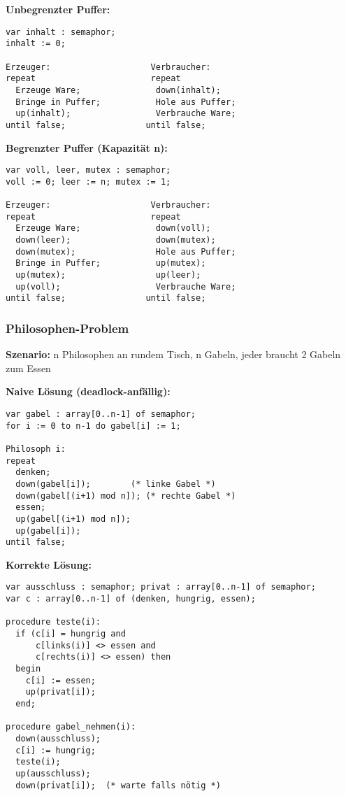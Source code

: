\documentclass[9pt,a4paper]{extarticle}
\begin{document}
\begin{multicols*}{2}
\textbf{Unbegrenzter Puffer:}
\begin{verbatim}
var inhalt : semaphor;
inhalt := 0;

Erzeuger:                    Verbraucher:
repeat                       repeat
  Erzeuge Ware;               down(inhalt);
  Bringe in Puffer;           Hole aus Puffer;
  up(inhalt);                 Verbrauche Ware;
until false;                until false;
\end{verbatim}

\textbf{Begrenzter Puffer (Kapazität n):}
\begin{verbatim}
var voll, leer, mutex : semaphor;
voll := 0; leer := n; mutex := 1;

Erzeuger:                    Verbraucher:
repeat                       repeat
  Erzeuge Ware;               down(voll);
  down(leer);                 down(mutex);
  down(mutex);                Hole aus Puffer;
  Bringe in Puffer;           up(mutex);
  up(mutex);                  up(leer);
  up(voll);                   Verbrauche Ware;
until false;                until false;
\end{verbatim}

\subsubsection{Philosophen-Problem}
\textbf{Szenario:} n Philosophen an rundem Tisch, n Gabeln, jeder braucht 2 Gabeln zum Essen

\textbf{Naive Lösung (deadlock-anfällig):}
\begin{verbatim}
var gabel : array[0..n-1] of semaphor;
for i := 0 to n-1 do gabel[i] := 1;

Philosoph i:
repeat
  denken;
  down(gabel[i]);        (* linke Gabel *)
  down(gabel[(i+1) mod n]); (* rechte Gabel *)
  essen;
  up(gabel[(i+1) mod n]);
  up(gabel[i]);
until false;
\end{verbatim}

\textbf{Korrekte Lösung:}
\begin{verbatim}
var ausschluss : semaphor; privat : array[0..n-1] of semaphor;
var c : array[0..n-1] of (denken, hungrig, essen);

procedure teste(i):
  if (c[i] = hungrig and 
      c[links(i)] <> essen and 
      c[rechts(i)] <> essen) then
  begin
    c[i] := essen;
    up(privat[i]);
  end;

procedure gabel_nehmen(i):
  down(ausschluss);
  c[i] := hungrig;
  teste(i);
  up(ausschluss);
  down(privat[i]);  (* warte falls nötig *)


\end{verbatim}
\end{multicols*}
\end{document}
